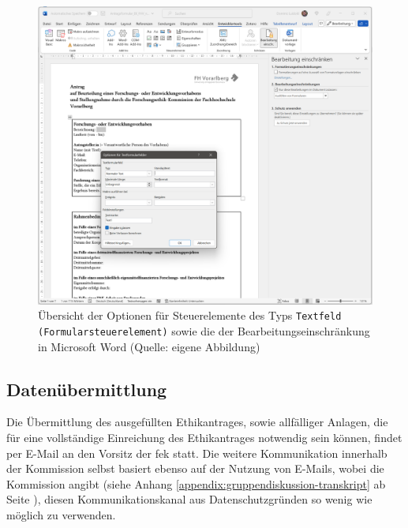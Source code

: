 \documentclass[a4paper,12pt,twoside]{scrreprt}
\begin{document}
\begin{figure}[ht]
    \centering
    \includegraphics[width=\linewidth]{thesis/images/Luidold_Word-Vorlage-FHV-Textformularfeld.png}
    \caption[Übersicht der Optionen für Steuerelemente des Typs \texttt{Textfeld (Formularsteuerelement)} sowie die der Bearbeitungseinschränkung in Microsoft Word]{Übersicht der Optionen für Steuerelemente des Typs \texttt{Textfeld (Formularsteuerelement)} sowie die der Bearbeitungseinschränkung in Microsoft Word (Quelle: eigene Abbildung)}
    \label{fig:optionen-textformularfeld-bearbeitungsmöglichkeiten}
\end{figure}

\subsection{Datenübermittlung}
\label{sub-sec:datenübermittlung}

Die Übermittlung des ausgefüllten Ethikantrages, sowie allfälliger Anlagen, die für eine vollständige Einreichung des Ethikantrages notwendig sein können, findet per E-Mail an den Vorsitz der \ac{fek} statt. \cite{fachhochschule_vorarlberg_gmbh_forschungsethik-kommission_2021} Die weitere Kommunikation innerhalb der Kommission selbst basiert ebenso auf der Nutzung von E-Mails, wobei die Kommission angibt (siehe Anhang \ref{appendix:gruppendiskussion-transkript} ab Seite \pageref{appendix:gruppendiskussion-transkript}), diesen Kommunikationskanal aus Datenschutzgründen so wenig wie möglich zu verwenden.
\end{document}

